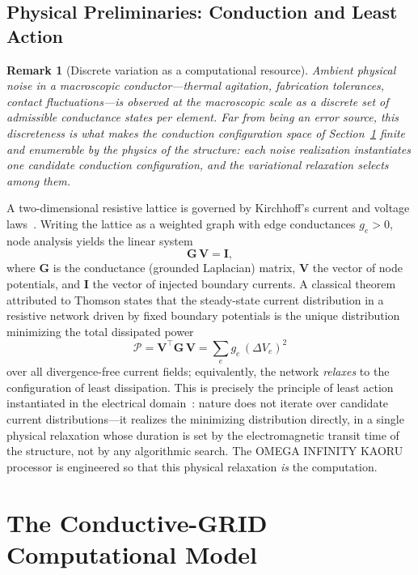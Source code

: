 \documentclass[letterpaper,journal]{IEEEtran}
\newtheorem{remark}{Remark}
\begin{document}
\subsection{Physical Preliminaries: Conduction and Least Action}
\label{sec:physics}
\begin{remark}[Discrete variation as a computational resource]
\label{rem:noise}
Ambient physical noise in a macroscopic conductor---thermal agitation,
fabrication tolerances, contact fluctuations---is observed at the
macroscopic scale as a \emph{discrete} set of admissible conductance
states per element. Far from being an error source, this discreteness is
what makes the conduction configuration space of
Section~\ref{sec:grid} finite and enumerable by the physics of the
structure: each noise realization instantiates one candidate conduction
configuration, and the variational relaxation selects among them.
\end{remark}
A two-dimensional resistive lattice is governed by Kirchhoff's current and
voltage laws~\cite{kirchhoff1847}. Writing the lattice as a weighted graph
with edge conductances $g_e>0$, node analysis yields the linear system
\begin{equation}
\mathbf{G}\,\mathbf{V}=\mathbf{I},
\label{eq:node}
\end{equation}
where $\mathbf{G}$ is the conductance (grounded Laplacian) matrix,
$\mathbf{V}$ the vector of node potentials, and $\mathbf{I}$ the vector of
injected boundary currents. A classical theorem attributed to Thomson states
that the steady-state current distribution in a resistive network driven by
fixed boundary potentials is the unique distribution minimizing the total
dissipated power
\begin{equation}
\mathcal{P}=\mathbf{V}^{\!\top}\mathbf{G}\,\mathbf{V}
=\sum_{e} g_e\,(\Delta V_e)^{2}
\label{eq:thomson}
\end{equation}
over all divergence-free current fields; equivalently, the network
\emph{relaxes} to the configuration of least dissipation. This is precisely
the principle of least action instantiated in the electrical
domain~\cite{feynman1964}: nature does not iterate over candidate current
distributions---it realizes the minimizing distribution directly, in a
single physical relaxation whose duration is set by the electromagnetic
transit time of the structure, not by any algorithmic search. The OMEGA
INFINITY KAORU processor is engineered so that this physical relaxation
\emph{is} the computation.

\section{The Conductive-GRID Computational Model}
\label{sec:grid}
\end{document}
